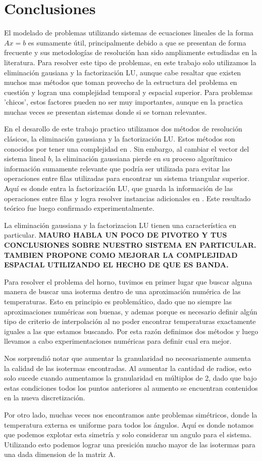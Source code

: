 \section{Conclusiones}

El modelado de problemas utilizando sistemas de ecuaciones lineales de la forma $Ax = b$ es sumamente útil, principalmente debido a que se presentan de forma frecuente y sus metodologías de resolución han sido ampliamente estudiadas en la literatura. Para resolver este tipo de problemas, en este trabajo solo utilizamos la eliminación gausiana y la factorización LU, aunque cabe resaltar que existen muchos mas métodos que toman provecho de la estructura del problema en cuestión y logran una complejidad temporal y espacial superior. Para problemas 'chicos', estos factores pueden no ser muy importantes, aunque en la practica muchas veces se presentan sistemas donde si se tornan relevantes.

En el desarollo de este trabajo practico utilizamos dos métodos de resolución clásicos, la eliminación gaussiana y la factorización LU. Estos métodos son conocidos por tener una complejidad en . Sin embargo, al cambiar el vector del sistema lineal $b$, la eliminación gaussiana pierde en su proceso algorítmico información sumamente relevante que podría ser utilizada para evitar las operaciones entre filas utilizadas para encontrar un sistema triangular superior. Aquí es donde entra la factorización LU, que guarda la información de las operaciones entre filas y logra resolver instancias adicionales en . Este resultado teórico fue luego confirmado experimentalmente.

La eliminación gaussiana y la factorizacion LU tienen una característica en particular. \textbf{MAURO HABLA UN POCO DE PIVOTEO Y TUS CONCLUSIONES SOBRE NUESTRO SISTEMA EN PARTICULAR. TAMBIEN PROPONE COMO MEJORAR LA COMPLEJIDAD ESPACIAL UTILIZANDO EL HECHO DE QUE ES BANDA.}

Para resolver el problema del horno, tuvimos en primer lugar que buscar alguna manera de buscar una isoterma dentro de una aproximación numérica de las temperaturas. Esto en principio es problemático, dado que no siempre las aproximaciones numéricas son buenas, y ademas porque es necesario definir algún tipo de criterio de interpolación al no poder encontrar temperaturas exactamente iguales a las que estamos buscando. Por esta razón definimos dos métodos y luego llevamos a cabo experimentaciones numéricas para definir cual era mejor. 

Nos sorprendió notar que aumentar la granularidad no necesariamente aumenta la calidad de las isotermas encontradas. Al aumentar la cantidad de radios, esto solo sucede cuando aumentamos la granularidad en múltiplos de 2, dado que bajo estas condiciones todos los puntos anteriores al aumento se encuentran contenidos en la nueva discretización.

Por otro lado, muchas veces nos encontramos ante problemas simétricos, donde la temperatura externa es uniforme para todos los ángulos. Aquí es donde notamos que podemos explotar esta simetría y solo considerar un angulo para el sistema. Utilizando esto podemos lograr una presición mucho mayor de las isotermas para una dada dimension de la matriz A.